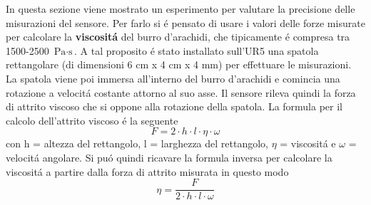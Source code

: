 In questa sezione viene mostrato un esperimento per valutare la precisione delle misurazioni del sensore. 
Per farlo si \'{e} pensato di usare i valori delle forze misurate per calcolare la \textbf{viscosit\'{a}} del burro d'arachidi, 
che tipicamente \'{e} compresa tra 1500-2500 $\text{Pa} \cdot \text{s}$. 
A tal proposito \'{e} stato installato sull'UR5 una spatola rettangolare (di dimensioni 6 cm x 4 cm x 4 mm) per effettuare le 
misurazioni. 
La spatola viene poi immersa all'interno del burro d'arachidi e comincia una rotazione a velocit\'{a} costante attorno al suo asse.
Il sensore rileva quindi la forza di attrito viscoso che si oppone alla rotazione della spatola. 
La formula per il calcolo dell'attrito viscoso \'{e} la seguente
\begin{equation*}
    F = 2 \cdot h \cdot l \cdot \eta \cdot \omega
\end{equation*}
con h = altezza del rettangolo, l = larghezza del rettangolo, $\eta$ = viscosit\'{a} e $\omega$ = velocit\'{a} angolare. 
Si pu\'{o} quindi ricavare la formula inversa per calcolare la viscosit\'{a} a partire dalla forza di attrito misurata in questo modo 
\begin{equation*}
    \eta = \frac{F}{2 \cdot h \cdot l \cdot \omega}
\end{equation*}